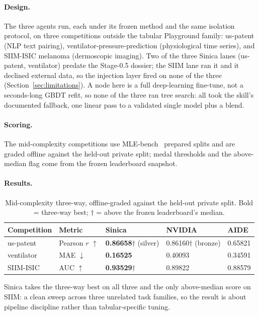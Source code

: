 \documentclass[11pt,a4paper]{article}
\newcommand{\dn}{\ensuremath{\downarrow}}
\newcommand{\up}{\ensuremath{\uparrow}}
\begin{document}
\paragraph{Design.} The three agents run, each under its frozen method and the same isolation protocol, on three competitions outside the tabular Playground family: us-patent (NLP text pairing), ventilator-pressure-prediction (physiological time series), and SIIM-ISIC melanoma (dermoscopic imaging). Two of the three Sinica lanes (us-patent, ventilator) predate the Stage-0.5 dossier; the SIIM lane ran it and it declined external data, so the injection layer fired on none of the three (Section~\ref{sec:limitations}). A node here is a full deep-learning fine-tune, not a seconds-long GBDT refit, so none of the three ran tree search: all took the skill's documented fallback, one linear pass to a validated single model plus a blend.

\paragraph{Scoring.} The mid-complexity competitions use MLE-bench~\cite{mlebench} prepared splits and are graded offline against the held-out private split; medal thresholds and the above-median flag come from the frozen leaderboard snapshot.

\paragraph{Results.}
\begin{table}[H]
\centering\small
\caption{Mid-complexity three-way, offline-graded against the held-out private split. Bold = three-way best; $\dagger$ = above the frozen leaderboard's median.}
\begin{tabular}{@{}lllll@{}}
\toprule
\textbf{Competition} & \textbf{Metric} & \textbf{Sinica} & \textbf{NVIDIA} & \textbf{AIDE} \\
\midrule
us-patent & Pearson $r$ \up & \textbf{0.86658}$\dagger$ (silver) & 0.86160$\dagger$ (bronze) & 0.65821 \\
ventilator & MAE \dn & \textbf{0.16525} & 0.40093 & 0.34591 \\
SIIM-ISIC & AUC \up & \textbf{0.93529}$\dagger$ & 0.89822 & 0.88579 \\
\bottomrule
\end{tabular}
\end{table}

Sinica takes the three-way best on all three and the only above-median score on SIIM: a clean sweep across three unrelated task families, so the result is about pipeline discipline rather than tabular-specific tuning.
\end{document}
